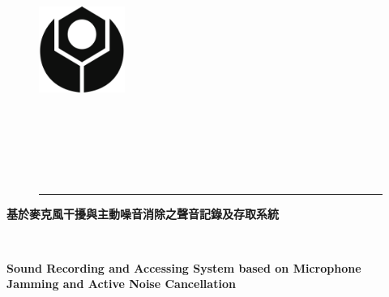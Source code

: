 \begin{titlepage}
    \begin{singlespace}
        \begin{center}
            \begin{figure}[htb]
                \begin{minipage}[c]{0cm} 
                    \raggedright
                    \includegraphics[width=1.1in]{style/logo.pdf}
                \end{minipage}
                \begin{minipage}[c]{\textwidth}
                    \centering
                    \\
                    \vspace{1cm}
                    \\
                    \vspace{1cm}
                    \\
                \end{minipage}
                \begin{minipage}[b]{\textwidth}
                    \raggedleft
                    \vspace{1cm}
                    \\
                \end{minipage}
                \rule{16cm}{3pt}
            \end{figure}
            \vspace{1.5cm}
            \parbox{0.7\textwidth}{\centering\bf\LARGE{
                基於麥克風干擾與主動噪音消除之聲音記錄及存取系統
            }}\\
            \vspace{0.5cm}
            \parbox{0.9\textwidth}{\centering\bf\LARGE{
                Sound Recording and Accessing System based on Microphone Jamming and Active Noise Cancellation
            }}\\

\end{center}
\end{singlespace}
\end{titlepage}
